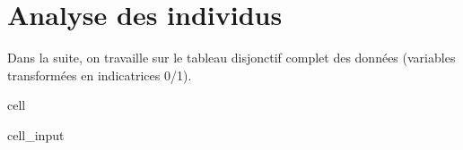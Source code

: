 \documentclass[letterpaper,10pt,french]{sphinxmanual}
\begin{document}
\section{Analyse des individus}
\label{\detokenize{TP3_AFC_ACM:analyse-des-individus}}
\sphinxAtStartPar
Dans la suite, on travaille sur le tableau disjonctif complet des données (variables transformées en indicatrices 0/1).

\begin{sphinxuseclass}{cell}
\begin{sphinxuseclass}{cell_input}
\begin{sphinxVerbatim}[commandchars=\\\{\}]
  
   
\end{sphinxVerbatim}


\end{sphinxuseclass}
\end{sphinxuseclass}
\end{document}
